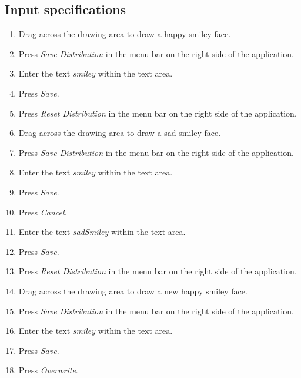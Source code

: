 \subsection*{Input specifications}
\begin{enumerate}
\item Drag across the drawing area to draw a happy smiley face.
\item Press \emph{Save Distribution} in the menu bar on the right side of the application.
\item Enter the text \emph{smiley} within the text area.
\item Press \emph{Save}.
\item Press \emph{Reset Distribution} in the menu bar on the right side of the application. 
\item Drag across the drawing area to draw a sad smiley face.
\item Press \emph{Save Distribution} in the menu bar on the right side of the application.
\item Enter the text \emph{smiley} within the text area.
\item Press \emph{Save}.
\item Press \emph{Cancel}.
\item Enter the text \emph{sadSmiley} within the text area.
\item Press \emph{Save}.
\item Press \emph{Reset Distribution} in the menu bar on the right side of the application.
\item Drag across the drawing area to draw a new happy smiley face.
\item Press \emph{Save Distribution} in the menu bar on the right side of the application.
\item Enter the text \emph{smiley} within the text area.
\item Press \emph{Save}.
\item Press \emph{Overwrite}.
\end{enumerate}

